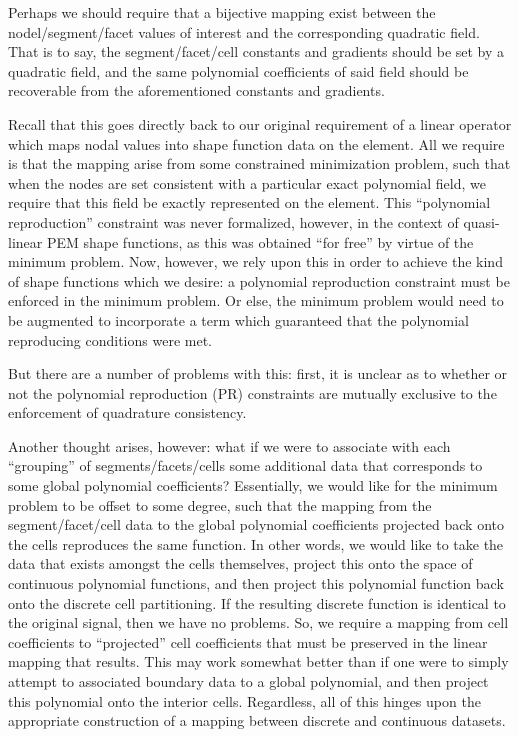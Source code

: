 \documentclass[11pt]{article} %
\begin{document}
Perhaps we should require that a bijective mapping exist between the nodel/segment/facet values of interest and the corresponding quadratic field. That is to say, the segment/facet/cell constants and gradients should be set by a quadratic field, and the same polynomial coefficients of said field should be recoverable from the aforementioned constants and gradients.

Recall that this goes directly back to our original requirement of a linear operator which maps nodal values into shape function data on the element. All we require is that the mapping arise from some constrained minimization problem, such that when the nodes are set consistent with a particular exact polynomial field, we require that this field be exactly represented on the element. This ``polynomial reproduction'' constraint was never formalized, however, in the context of quasi-linear PEM shape functions, as this was obtained ``for free'' by virtue of the minimum problem. Now, however, we rely upon this in order to achieve the kind of shape functions which we desire: a polynomial reproduction constraint must be enforced in the minimum problem. Or else, the minimum problem would need to be augmented to incorporate a term which guaranteed that the polynomial reproducing conditions were met.

But there are a number of problems with this: first, it is unclear as to whether or not the polynomial reproduction (PR) constraints are mutually exclusive to the enforcement of quadrature consistency.

Another thought arises, however: what if we were to associate with each ``grouping'' of segments/facets/cells some additional data that corresponds to some global polynomial coefficients? Essentially, we would like for the minimum problem to be offset to some degree, such that the mapping from the segment/facet/cell data to the global polynomial coefficients projected back onto the cells reproduces the same function. In other words, we would like to take the data that exists amongst the cells themselves, project this onto the space of continuous polynomial functions, and then project this polynomial function back onto the discrete cell partitioning. If the resulting discrete function is identical to the original signal, then we have no problems. So, we require a mapping from cell coefficients to ``projected'' cell coefficients that must be preserved in the linear mapping that results. This may work somewhat better than if one were to simply attempt to associated boundary data to a global polynomial, and then project this polynomial onto the interior cells. Regardless, all of this hinges upon the appropriate construction of a mapping between discrete and continuous datasets.
\end{document}
